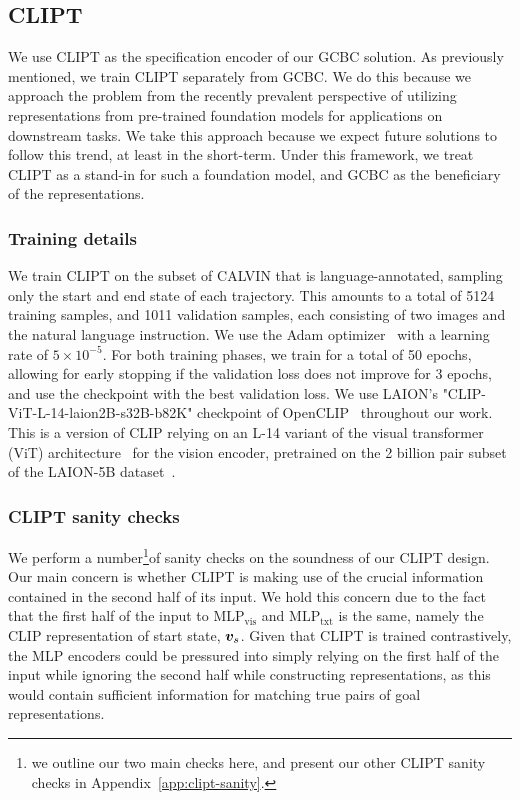 \documentclass[../main.tex]{subfiles}
\begin{document}
\subsection{CLIPT}

We use CLIPT as the specification encoder of our GCBC solution. As previously mentioned, we train
CLIPT separately from GCBC. We do this because we approach the problem from the recently prevalent
perspective of utilizing representations from pre-trained foundation models for applications on
downstream tasks. We take this approach because we expect future solutions to follow this trend, at
least in the short-term. Under this framework, we treat CLIPT as a stand-in for such a foundation
model, and GCBC as the beneficiary of the representations.

\subsubsection{Training details}\label{exp:sec:clipt-train}

We train CLIPT on the subset of CALVIN that is language-annotated, sampling only the start and end
state of each trajectory. This amounts to a total of 5124 training samples, and 1011 validation
samples, each consisting of two images and the natural language instruction. We use the Adam
optimizer~\citep{kingma_adam_2015} with a learning rate of $5 \times 10^{-5}$. For both training
phases, we train for a total of 50 epochs, allowing for early stopping if the validation loss does
not improve for 3 epochs, and use the checkpoint with the best validation loss. We use LAION's
"CLIP-ViT-L-14-laion2B-s32B-b82K" checkpoint of OpenCLIP~\citep{ilharco_openclip_2021} throughout
our work. This is a version of CLIP relying on an L-14 variant of the visual transformer (ViT)
architecture~\citep{dosovitskiy_image_2022} for the vision encoder, pretrained on the 2 billion pair
subset of the LAION-5B dataset~\citep{schuhmann_laion-5b_2022}.

\subsubsection{CLIPT sanity checks}

We perform a number\footnote{we outline our two main checks here, and present our other CLIPT sanity
	checks in Appendix~\ref{app:clipt-sanity}.}of sanity checks on the soundness of our CLIPT design.
Our main concern is whether CLIPT is making use of the crucial information contained in the second
half of its input. We hold this concern due to the fact that the first half of the input to
$\text{MLP}_\text{vis}$ and $\text{MLP}_\text{txt}$ is the same, namely the CLIP representation of
start state, $\bm v_s$. Given that CLIPT is trained contrastively, the MLP encoders could be
pressured into simply relying on the first half of the input while ignoring the second half while
constructing representations, as this would contain sufficient information for matching true pairs
of goal representations.
\end{document}
